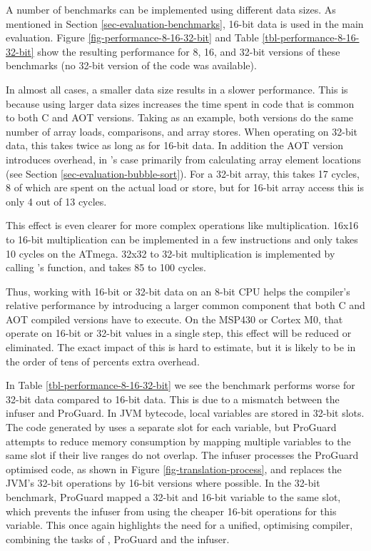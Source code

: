 A number of benchmarks can be implemented using different data sizes. As mentioned in Section \ref{sec-evaluation-benchmarks}, 16-bit data is used in the main evaluation. Figure \ref{fig-performance-8-16-32-bit} and Table \ref{tbl-performance-8-16-32-bit} show the resulting performance for 8, 16, and 32-bit versions of these benchmarks (no 32-bit version of the  code was available).

In almost all cases, a smaller data size results in a slower performance. This is because using larger data sizes increases the time spent in code that is common to both C and AOT versions. Taking  as an example, both versions do the same number of array loads, comparisons, and array stores. When operating on 32-bit data, this takes twice as long as for 16-bit data. In addition the AOT version introduces overhead, in 's case primarily from calculating array element locations (see Section \ref{sec-evaluation-bubble-sort}). For a 32-bit array, this takes 17 cycles, 8 of which are spent on the actual load or store, but for 16-bit array access this is only 4 out of 13 cycles.

This effect is even clearer for more complex operations like multiplication. 16x16 to 16-bit multiplication can be implemented in a few instructions and only takes 10 cycles on the ATmega. 32x32 to 32-bit multiplication is implemented by calling 's  function, and takes 85 to 100 cycles.

Thus, working with 16-bit or 32-bit data on an 8-bit CPU helps the compiler's relative performance by introducing a larger common component that both C and AOT compiled versions have to execute. On the MSP430 or Cortex M0, that operate on 16-bit or 32-bit values in a single step, this effect will be reduced or eliminated. The exact impact of this is hard to estimate, but it is likely to be in the order of tens of percents extra overhead.

In Table \ref{tbl-performance-8-16-32-bit} we see the  benchmark performs worse for 32-bit data compared to 16-bit data. This is due to a mismatch between the infuser and ProGuard. In JVM bytecode, local variables are stored in 32-bit slots. The code generated by  uses a separate slot for each variable, but ProGuard attempts to reduce memory consumption by mapping multiple variables to the same slot if their live ranges do not overlap. The infuser processes the ProGuard optimised code, as shown in Figure \ref{fig-translation-process}, and replaces the JVM's 32-bit operations by 16-bit versions where possible. In the 32-bit  benchmark, ProGuard mapped a 32-bit and 16-bit variable to the same slot, which prevents the infuser from using the cheaper 16-bit operations for this variable. This once again highlights the need for a unified, optimising compiler, combining the tasks of , ProGuard and the infuser.

